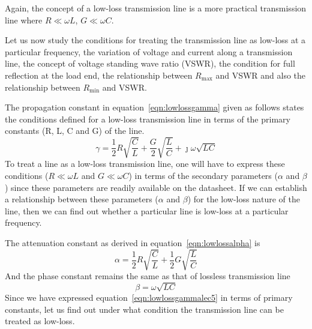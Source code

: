Again, the concept of a low-loss transmission line is a more practical transmission line where $R\ll\omega L$, $G\ll\omega C $.

Let us now study the conditions for treating the transmission line as low-loss at a particular frequency, the variation of voltage and current along a transmission line, the concept of voltage standing wave ratio (VSWR), the condition for full reflection at the load end, the relationship between $R_{\max}$ and VSWR and also the relationship between $R_{\min}$ and VSWR.

The propagation constant in equation~\eqref{eqn:lowlossgamma} given as follows states the conditions defined for a low-loss transmission line in terms of the primary constants (R, L, C and G) of the line.
\begin{equation}
\gamma = \frac{1}{2}R\sqrt{\frac{C}{L}} + \frac{G}{2}\sqrt{\frac{L}{C}} +\jmath\omega\sqrt{LC}
\label{eqn:lowlossgammalec5}
\end{equation}
To treat a line as a low-loss transmission line, one will have to express these conditions ($R\ll\omega L$ and $G\ll\omega C$) in terms of the secondary parameters ($\alpha$ and $\beta$) since these parameters are readily available on the datasheet. If we can establish a relationship between these parameters ($\alpha$ and $\beta $) for the low-loss nature of the line, then we can find out whether a particular line is low-loss at a particular frequency.

The attenuation constant as derived in equation~\eqref{eqn:lowlossalpha} is
\begin{equation}
\alpha = \frac{1}{2}R\sqrt{\frac{C}{L}} + \frac{1}{2}G\sqrt{\frac{L}{C}}	
\label{eqn:lowlossalphalec5}
\end{equation}
And the phase constant remains the same as that of lossless transmission line
\begin{equation}
\beta = \omega\sqrt{LC}
\end{equation}
Since we have expressed equation~\eqref{eqn:lowlossgammalec5} in terms of primary constants, let us find out under what condition the transmission line can be treated as low-loss.

